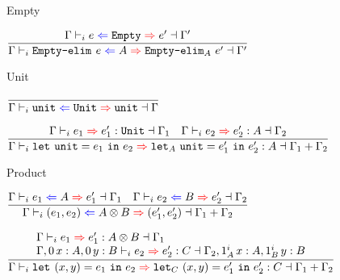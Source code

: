 \documentclass{beamer}
\begin{document}
\begin{frame}{Empty}

\begin{center}
  $\infrule{\checkelab{\Gamma}{e}{\Empty}{e'}{\Gamma'}}{\checkelab{\Gamma}{\emptyelim{e}}{A}{\emptyelim{e'}[A]}{\Gamma'}}$
\end{center}

\end{frame}

\begin{frame}{Unit}

\begin{center}
  $\infrule{}{\checkelab{\Gamma}{\unit}{\Unit}{\unit}{\Gamma}}$

  \vspace{2em}

  $\infrule{\inferelab{\Gamma}{e_1}{e_1'}{\Unit}{\Gamma_1} \quad \inferelab{\Gamma}{e_2}{e_2'}{A}{\Gamma_2}}{\inferelab{\Gamma}{\unitelim{e_1}{e_2}}{\unitelim{e_1'}{e_2'}[A]}{A}{\addctx{\Gamma_1}{\Gamma_2}}}$
\end{center}

\end{frame}

\begin{frame}{Product}

\begin{center}
  $\infrule{\checkelab{\Gamma}{e_1}{A}{e_1'}{\Gamma_1} \quad \checkelab{\Gamma}{e_2}{B}{e_2'}{\Gamma_2}}{\checkelab{\Gamma}{\pair{e_1}{e_2}}{\Prod{A}{B}}{\pair{e_1'}{e_2'}}{\addctx{\Gamma_1}{\Gamma_2}}}$

  \vspace{2em}

  $\infrule{\begin{array}{l} \inferelab{\Gamma}{e_1}{e_1'}{\Prod{A}{B}}{\Gamma_1} \\ \inferelab{\extend{\extend{\Gamma}[\Zero]{x}{A}}[\Zero]{y}{B}}{e_2}{e_2'}{C}{\extend{\extend{\Gamma_2}[\totalqty{\One}{A}]{x}{A}}[\totalqty{\One}{B}]{y}{B}} \end{array}}{\inferelab{\Gamma}{\letpair{x}{y}{e_1}{e_2}}{\letpair{x}{y}{e_1'}{e_2'}[C]}{C}{\addctx{\Gamma_1}{\Gamma_2}}}$
\end{center}

\end{frame}
\end{document}
